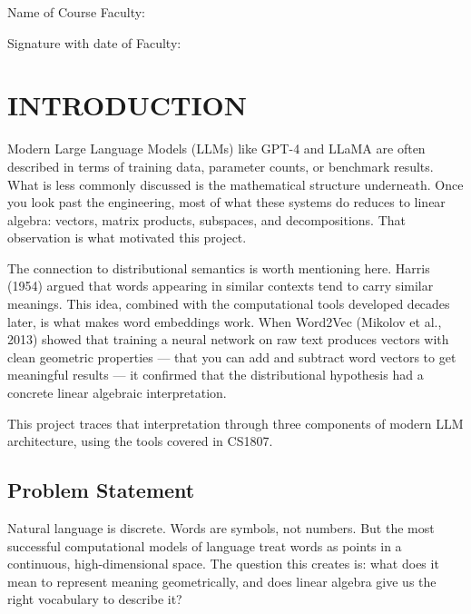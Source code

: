 \documentclass[12pt,a4paper]{article}
\begin{document}
\vspace{3cm}

Name of Course Faculty: \underline{\hspace{7cm}}

\vspace{1cm}

Signature with date of Faculty: \underline{\hspace{7cm}}

\newpage
\tableofcontents

\newpage
{}

\section{INTRODUCTION}

Modern Large Language Models (LLMs) like GPT-4 and LLaMA are often described in terms of training
data, parameter counts, or benchmark results. What is less commonly discussed is the mathematical
structure underneath. Once you look past the engineering, most of what these systems do reduces to
linear algebra: vectors, matrix products, subspaces, and decompositions. That observation is what
motivated this project.

The connection to distributional semantics is worth mentioning here. Harris (1954) argued that
words appearing in similar contexts tend to carry similar meanings. This idea, combined with
the computational tools developed decades later, is what makes word embeddings work. When
Word2Vec (Mikolov et al., 2013) showed that training a neural network on raw text produces
vectors with clean geometric properties --- that you can add and subtract word vectors to get
meaningful results --- it confirmed that the distributional hypothesis had a concrete linear
algebraic interpretation.

This project traces that interpretation through three components of modern LLM architecture,
using the tools covered in CS1807.

\subsection{Problem Statement}

Natural language is discrete. Words are symbols, not numbers. But the most successful
computational models of language treat words as points in a continuous, high-dimensional space.
The question this creates is: what does it mean to represent meaning geometrically, and does
linear algebra give us the right vocabulary to describe it?
\end{document}
